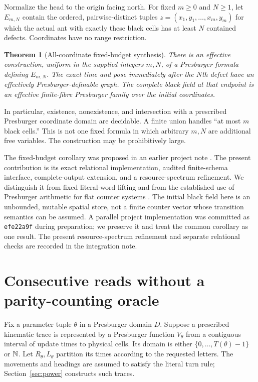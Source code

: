 \documentclass[11pt]{article}
\newtheorem{theorem}{Theorem}[section]
\theoremstyle{remark}\newtheorem{remark}[theorem]{Remark}
\begin{document}
Normalize the head to the origin facing north. For fixed $m\ge0$ and $N\ge1$,
let $E_{m,N}$ contain the ordered, pairwise-distinct tuples
$z=(x_1,y_1,\ldots,x_m,y_m)$ for which the actual ant with exactly these black
cells has at least $N$ contained defects. Coordinates have no range restriction.

\begin{theorem}[All-coordinate fixed-budget synthesis]\label{thm:main}
There is an effective construction, uniform in the supplied integers $m,N$,
of a Presburger formula defining $E_{m,N}$. The exact time and pose immediately
after the $N$th defect have an effectively Presburger-definable graph. The
complete black field at that endpoint is an effective finite-fibre Presburger
family over the initial coordinates.
\end{theorem}

In particular, existence, nonexistence, and intersection with a prescribed
Presburger coordinate domain are decidable. A finite union handles ``at most
$m$ black cells.'' This is not one fixed formula in which arbitrary $m,N$ are
additional free variables. The construction may be prohibitively large.

The fixed-budget corollary was proposed in an earlier project note
\cite{proposal}. The present contribution is its exact relational implementation,
audited finite-schema interface, complete-output extension, and a resource-spectrum
refinement. We distinguish it from fixed literal-word lifting and from the
established use of Presburger arithmetic for flat counter systems
\cite{flat}. The initial black field here is an unbounded, mutable spatial store,
not a finite counter vector whose transition semantics can be assumed. A parallel project
implementation was committed as \texttt{efe22a9f} during preparation; we preserve
it and treat the common corollary as one result. The present resource-spectrum
refinement and separate relational checks are recorded in the integration note.

\section{Consecutive reads without a parity-counting oracle}
Fix a parameter tuple $\theta$ in a Presburger domain $D$. Suppose a prescribed
kinematic trace is represented by a Presburger function $V_\theta$ from a
contiguous interval of update times to physical cells. Its domain is either
$\{0,\ldots,T(\theta)-1\}$ or $\mathbb N$. Let $R_\theta,L_\theta$ partition its times
according to the requested letters. The movements and headings are assumed to
satisfy the literal turn rule; Section~\ref{sec:power} constructs such traces.
\end{document}
